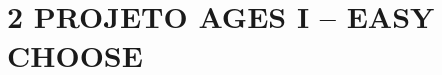 \hypertarget{__RefHeading___Toc4731_3118176633}{}
\hypertarget{_Toc45627142}{}
\chapter*{2 PROJETO AGES I – EASY CHOOSE}
\label{ages-i:text-h-0002}
